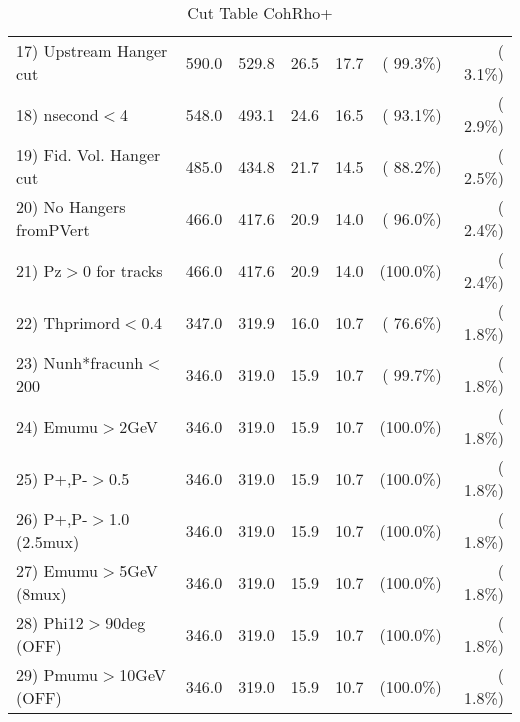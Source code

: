 \begin{table}[h!]
\begin{tabular}{||l||r|r|r|r|r|r||}
 17) Upstream Hanger cut  &        590.0 &        529.8 &         26.5 &         17.7 & ( 99.3\%) & (  3.1\%) \\
 18) nsecond$<$4          &        548.0 &        493.1 &         24.6 &         16.5 & ( 93.1\%) & (  2.9\%) \\
 19) Fid. Vol. Hanger cut &        485.0 &        434.8 &         21.7 &         14.5 & ( 88.2\%) & (  2.5\%) \\
 20) No Hangers fromPVert &        466.0 &        417.6 &         20.9 &         14.0 & ( 96.0\%) & (  2.4\%) \\
 21) Pz$>$0 for tracks    &        466.0 &        417.6 &         20.9 &         14.0 & (100.0\%) & (  2.4\%) \\
 22) Thprimord$<$0.4      &        347.0 &        319.9 &         16.0 &         10.7 & ( 76.6\%) & (  1.8\%) \\
 23) Nunh*fracunh$<$200   &        346.0 &        319.0 &         15.9 &         10.7 & ( 99.7\%) & (  1.8\%) \\
 24) Emumu$>$2GeV         &        346.0 &        319.0 &         15.9 &         10.7 & (100.0\%) & (  1.8\%) \\
 25) P+,P-$>$0.5          &        346.0 &        319.0 &         15.9 &         10.7 & (100.0\%) & (  1.8\%) \\
 26) P+,P-$>$1.0 (2.5mux) &        346.0 &        319.0 &         15.9 &         10.7 & (100.0\%) & (  1.8\%) \\
 27) Emumu$>$5GeV  (8mux) &        346.0 &        319.0 &         15.9 &         10.7 & (100.0\%) & (  1.8\%) \\
 28) Phi12$>$90deg  (OFF) &        346.0 &        319.0 &         15.9 &         10.7 & (100.0\%) & (  1.8\%) \\
 29) Pmumu$>$10GeV  (OFF) &        346.0 &        319.0 &         15.9 &         10.7 & (100.0\%) & (  1.8\%) \\
 \hline
 \hline
 \end{tabular}
 \caption{Cut Table  CohRho+  }
 \label{tab-cutcohjpsi-mumu_cohrhop}
 \end{table}
